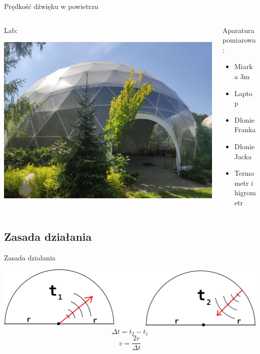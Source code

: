 \documentclass{beamer}
\begin{document}
\begin{frame}{Prędkość dźwięku w powietrzu}

	\begin{columns}
		\begin{column}{0.5\textwidth}
			Lab:

			\includegraphics[width=\linewidth]{lab_KlaKop.jpg}
		\end{column}
		\begin{column}{0.5\textwidth}
			Aparatura pomiarowa:
			\begin{itemize}
				\item Miarka 3m
				\item Laptop
				\item Dłonie Franka
				\item Dłonie Jacka
				\item Termometr i higrometr
			\end{itemize}
		\end{column}
	\end{columns}

\end{frame}

\subsection{Zasada działania}

\begin{frame}{Zasada działania}

	\includegraphics[width=\linewidth]{wave.png}
	$$\Delta t=t_2-t_1$$
	$$v=\frac{2r}{\Delta t}$$

\end{frame}
\end{document}
